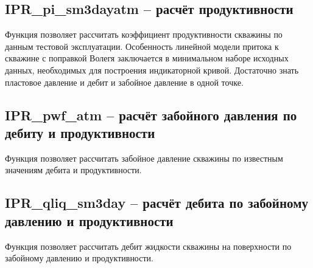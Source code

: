\subsection{IPR\_pi\_sm3dayatm – расчёт продуктивности}
Функция позволяет рассчитать коэффициент продуктивности скважины по данным тестовой эксплуатации. Особенность линейной модели притока к скважине с поправкой Волегя заключается в минимальном наборе исходных данных, необходимых для построения индикаторной кривой. Достаточно знать пластовое давление и дебит и забойное давление в одной точке.



\subsection{IPR\_pwf\_atm – расчёт забойного давления по дебиту и продуктивности}
Функция позволяет рассчитать забойное давление скважины по известным значениям дебита и продуктивности.


\subsection{IPR\_qliq\_sm3day – расчёт дебита по забойному давлению и продуктивности}
Функция позволяет рассчитать дебит жидкости скважины на поверхности по забойному давлению и продуктивности.




\newpage
